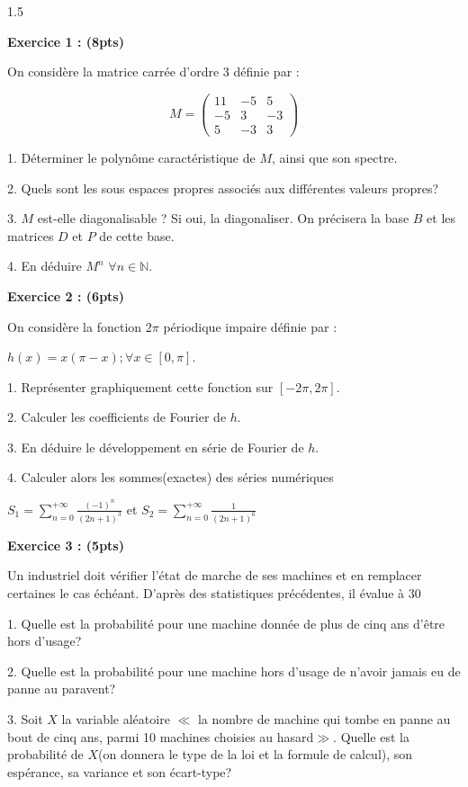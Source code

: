 \documentclass[12pt]{article}
\begin{document}
\begin{spacing}{1.5}

\textbf{Exercice 1 : (8pts)}

On considère la matrice carrée d'ordre 3 définie par  : 

\[M=\begin{pmatrix}
11 & -5 & 5 \\ 
-5 & 3 & -3 \\ 
5 & -3 & 3
\end{pmatrix}\]

1. Déterminer le polynôme caractéristique de $M$, ainsi que son spectre.

2. Quels sont les sous espaces propres associés aux différentes valeurs propres?

3. $M$ est-elle diagonalisable ? Si oui, la diagonaliser. On précisera la base $B$ et les matrices $D$ et $P$ de cette base.

4. En déduire $M^{n}$ $\forall n\in \mathbb{N}$.

\textbf{Exercice 2 : (6pts)}

On considère la fonction $2\pi$ périodique impaire définie par : 

$h(x)=x(\pi-x); \forall {x}\in [0,\pi]$.

1. Représenter graphiquement cette fonction sur $[-2\pi,2\pi]$.

2. Calculer les coefficients de Fourier de $h$.

3. En déduire le développement en série de Fourier de $h$.

4. Calculer alors les sommes(exactes) des séries numériques 

$S_1 = \sum^{+\infty}_{n=0}\frac{(-1)^n}{(2n+1)^3}$ et $S_2 = \sum^{+\infty}_{n=0}\frac{1}{(2n+1)^6}$

\textbf{Exercice 3 : (5pts)}

Un industriel doit vérifier l'état de marche de ses machines et en remplacer certaines le cas échéant. D'après des statistiques précédentes, il évalue à 30%

1. Quelle est la probabilité pour une machine donnée de plus de cinq ans d'être hors d'usage?

2. Quelle est la probabilité pour une machine hors d'usage de n'avoir jamais eu de panne au paravent?

3. Soit $X$ la variable aléatoire $\ll$ {la nombre de machine qui tombe en panne au bout de cinq ans, parmi 10 machines choisies au hasard}$\gg$. Quelle est la probabilité de $X$(on donnera le type de la loi et la formule de calcul), son espérance, sa variance et son écart-type?

\end{spacing}
\end{document}
